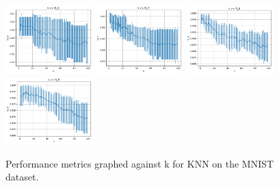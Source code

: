 \begin{figure}
    \includegraphics[width=0.30\textwidth]{figures/mnist_knn_f1_6.pdf}
    \includegraphics[width=0.30\textwidth]{figures/mnist_knn_f1_7.pdf}
    \includegraphics[width=0.30\textwidth]{figures/mnist_knn_f1_8.pdf}
    \includegraphics[width=0.30\textwidth]{figures/mnist_knn_f1_9.pdf}
    \caption{Performance metrics graphed against k for KNN on the MNIST dataset.}
    \label{fig:mnist_knn}
\end{figure}

